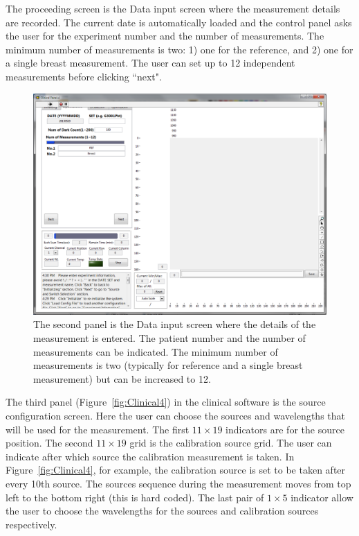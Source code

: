 The proceeding screen is the Data input screen where the measurement details are recorded. The current date is automatically loaded and the control panel asks the user for the experiment number and the number of measurements. The minimum number of measurements is two: 1) one for the reference, and 2) one for a single breast measurement. The user can set up to 12 independent measurements before clicking ``next".
\begin{figure}[h]
\centering
\includegraphics[width=13.5cm]{./figures/A_Gen3Software/Clinical3.png}
\caption[Measurement record panel in the clinical software]{The second panel is the Data input screen where the details of the measurement is entered. The patient number and the number of measurements can be indicated. The minimum number of measurements is two (typically for reference and a single breast measurement) but can be increased to 12.}
\label{fig:Clinical3}
\end{figure}

The third panel (Figure~\ref{fig:Clinical4}) in the clinical software is the source configuration screen. Here the user can choose the sources and wavelengths that will be used for the measurement. The first $11\times19$ indicators are for the source position. The second $11\times19$ grid is the calibration source grid. The user can indicate after which source the calibration measurement is taken. In Figure~\ref{fig:Clinical4}, for example, the calibration source is set to be taken after every 10th source. The sources sequence during the measurement moves from top left to the bottom right (this is hard coded). The last pair of $1\times 5$ indicator allow the user to choose the wavelengths for the sources and calibration sources respectively.

